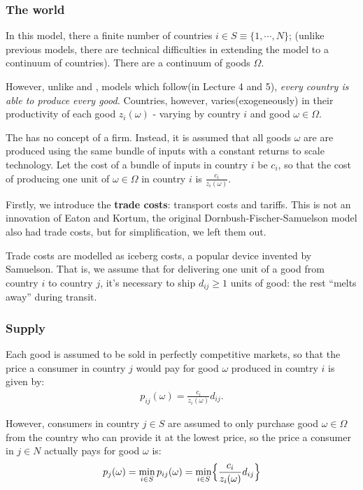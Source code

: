 \subsubsection{The world}

In this model, there a finite number of countries $i \in S \equiv \{1, \cdots, N\}$; 
(unlike previous models, there are technical difficulties in extending the model to a continuum of countries).
There are a continuum of goods $\Omega$.

However, unlike \cite{krugman1980scale} and \cite{melitz2003impact}, models which follow(in Lecture 4 and 5),
\textit{every country is able to produce every good.}
Countries, however, varies(exogeneously) in their productivity of each good $z_i(\omega)$ - varying by country $i$ and good $\omega \in \Omega$.

The \cite{eaton2002technology} has no concept of a firm. Instead, it is assumed that all
goods $\omega$ are are produced using the same bundle of inputs with a constant returns to
scale technology. Let the cost of a bundle of inputs in country $i$ be $c_i$,
so that the cost of producing one unit of $\omega \in \Omega$ in country $i$ is $\frac{c_i}{z_i(\omega)}$.

Firstly, we introduce the \textbf{trade costs}: transport costs and tariffs. This is not an innovation of Eaton
and Kortum, the original Dornbush-Fischer-Samuelson model also had trade costs, but for simplification, we left them out.
    
Trade costs are modelled as iceberg costs, a popular device invented by Samuelson\cite{samuelson1954transfer}.
That is, we assume that for delivering one unit of a good from country $i$ to country $j$, 
it's necessary to ship $d_{ij} \geq 1$ units of good: the rest “melts away” during transit. 

\subsubsection{Supply}

Each good is assumed to be sold in perfectly competitive markets, so that the price a
consumer in country $j$ would pay for good $\omega$ produced in country $i$ is given by:
\begin{gather*}
    p_{ij}(\omega) = \frac{c_i}{z_i(\omega)} d_{ij}. \label{eq:EKprice}
\end{gather*}

However, consumers in country $j \in S$ are assumed to only purchase good $\omega \in \Omega$
from the country who can provide it at the lowest price, so the price a consumer in
$j \in N$ actually pays for good $\omega$ is:
\begin{gather*}
    p_j(\omega) = \min_{i \in S} p_{ij}(\omega) = \min _{i \in S} \Bigl\{ \frac{c_i}{z_i(\omega)} d_{ij} \Bigr\} \label{eq:EKprice2}
\end{gather*}

